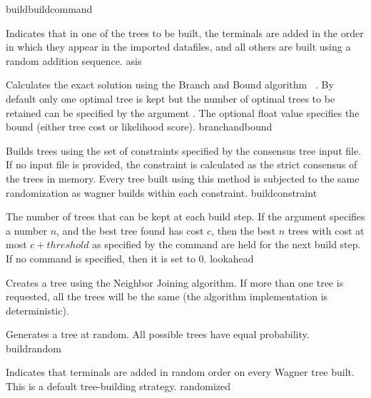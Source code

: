 \begin{command}{build}{buildcommand}
\begin{arguments}
            {Indicates that in one of the trees to be built, the terminals are
            added in the order in which they appear in the imported datafiles,
            and all others are built using a random addition sequence.}
            {asis}

            {Calculates the exact solution using the Branch and Bound algorithm
            ~\cite{hendy1982}. By default only one optimal tree is kept but
            the number of optimal trees to be retained can be specified by the
            argument . The optional float value specifies the
            bound (either tree cost or likelihood score).}
            {branchandbound} 

            {Builds trees using the set of constraints specified by the consensus
            tree input file. If no input file is provided, the constraint is calculated as
            the strict consensus of the trees in memory. Every tree built
            using this method is subjected to the same randomization as wagner
            builds within each constraint.}
            {buildconstraint}

            {The number of trees that can be kept at each build step. If the
             argument 
            specifies a number $n$, and the best tree found has cost $c$, then the best $n$
            trees with cost at most $c + threshold$ as specified by
            the  command are held for the
            next build step. If no  command is specified,
            then it is set to $0$.}
            {lookahead}

            {Creates a tree using the Neighbor Joining algorithm. If more than
            one tree is requested, all the trees will be the same (the algorithm
            implementation is deterministic).}{}

            {Generates a tree at random.  All possible trees have equal probability.}
            {buildrandom}

            {Indicates that terminals are added in random order on every Wagner tree built. This is a default tree-building strategy.}
            {randomized}


\end{arguments}
\end{command}

